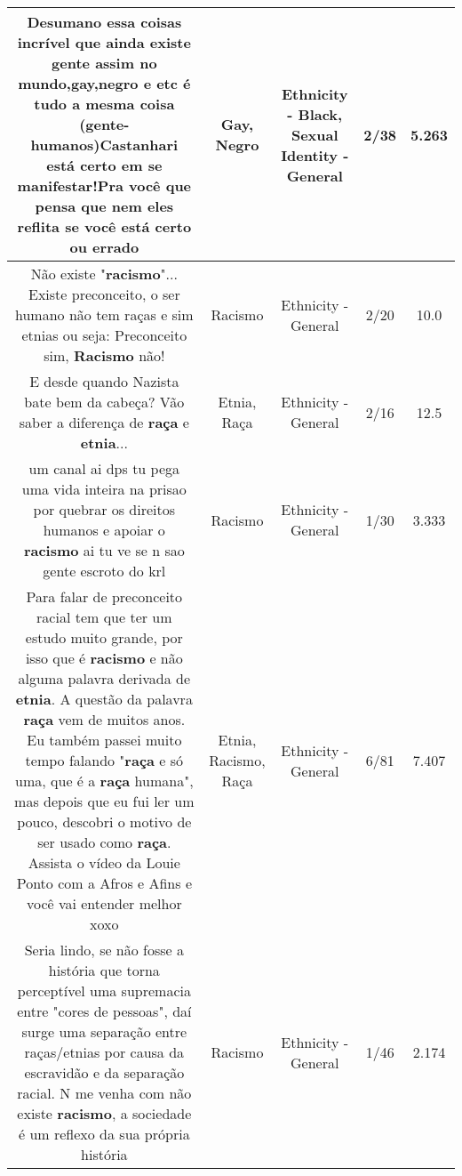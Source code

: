 \documentclass[11pt]{article}
\newlength\mylength
\begin{document}
\begin{center}
\begin{longtable}{|C{.65\mylength}|C{.30\mylength}|C{.12\mylength}|C{.12\mylength}|C{.12\mylength}|}
  \small Desumano essa coisas incrível que ainda existe gente assim no mundo,\textbf{gay},\textbf{negro} e etc é tudo a mesma coisa (gente-humanos)Castanhari está certo em se manifestar!Pra você que pensa que nem eles reflita se você está certo ou errado\normalsize   & Gay, Negro & Ethnicity - Black, Sexual Identity - General & 2/38 & 5.263 \\  \hline
  \small Não existe "\textbf{racismo}"... Existe preconceito, o ser humano não tem raças e sim etnias ou seja: Preconceito sim, \textbf{Racismo} não!\normalsize   & Racismo & Ethnicity - General & 2/20 & 10.0 \\  \hline
  \small E desde quando Nazista bate bem da cabeça? Vão saber a diferença de \textbf{raça} e \textbf{etnia}...\normalsize   & Etnia, Raça & Ethnicity - General & 2/16 & 12.5 \\  \hline
  \small um canal ai dps tu pega uma vida inteira na prisao por quebrar os direitos humanos e apoiar o \textbf{racismo} ai tu ve se n sao gente escroto do krl\normalsize   & Racismo & Ethnicity - General & 1/30 & 3.333 \\  \hline
  \small Para falar de preconceito racial tem que ter um estudo muito grande, por isso que é \textbf{racismo} e não alguma palavra derivada de \textbf{etnia}. A questão da palavra \textbf{raça} vem de muitos anos. Eu também passei muito tempo falando "\textbf{raça} e só uma, que é a \textbf{raça} humana", mas depois que eu fui ler um pouco, descobri o motivo de ser usado como \textbf{raça}. Assista o vídeo da Louie Ponto com a Afros e Afins e você vai entender melhor xoxo\normalsize   & Etnia, Racismo, Raça & Ethnicity - General & 6/81 & 7.407 \\  \hline
  \small Seria lindo, se não fosse a história que torna perceptível uma supremacia entre "cores de pessoas", daí surge uma separação entre raças/etnias por causa da escravidão e da separação racial. N me venha com não existe \textbf{racismo}, a sociedade é um reflexo da sua própria história\normalsize   & Racismo & Ethnicity - General & 1/46 & 2.174 \\  \hline

\end{longtable}
\end{center}
\end{document}
